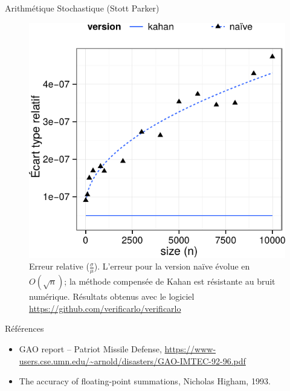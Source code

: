 \documentclass{beamer}
\begin{document}
\begin{frame}{Arithmétique Stochastique (Stott Parker)}

    \begin{figure}
        \centering
        \includegraphics[width=.5\linewidth]{kahan.pdf}
        \caption{Erreur relative ($\frac{\sigma}{\mu}$). L'erreur pour la version naïve évolue en $O(\sqrt{n})$; la méthode compensée de Kahan est résistante au bruit numérique. Résultats obtenus avec le logiciel \url{https://github.com/verificarlo/verificarlo}}
    \end{figure}
\end{frame}

\begin{frame}{Références}
    \begin{itemize}
        \item GAO report -- Patriot Missile Defense, \url{https://www-users.cse.umn.edu/~arnold/disasters/GAO-IMTEC-92-96.pdf}
        \item The accuracy of floating-point summations, Nicholas Higham, 1993.
    \end{itemize}
\end{frame}
\end{document}

